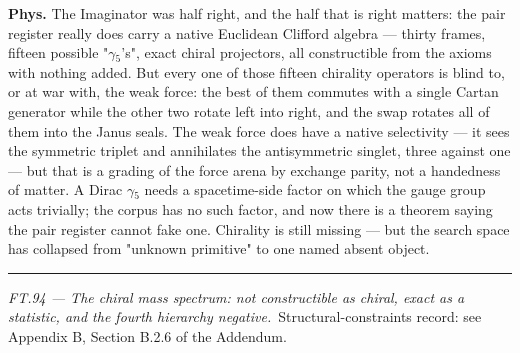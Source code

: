 \begin{theorem}
\textbf{Phys.} The Imaginator was half right, and the half that is right matters: the pair register really does carry a native Euclidean Clifford algebra — thirty frames, fifteen possible "$\gamma$$_5$'s", exact chiral projectors, all constructible from the axioms with nothing added. But every one of those fifteen chirality operators is blind to, or at war with, the weak force: the best of them commutes with a single Cartan generator while the other two rotate left into right, and the swap rotates all of them into the Janus seals. The weak force does have a native selectivity — it sees the symmetric triplet and annihilates the antisymmetric singlet, three against one — but that is a grading of the force arena by exchange parity, not a handedness of matter. A Dirac $\gamma$$_5$ needs a spacetime-side factor on which the gauge group acts trivially; the corpus has no such factor, and now there is a theorem saying the pair register cannot fake one. Chirality is still missing — but the search space has collapsed from "unknown primitive" to one named absent object.

\vspace{2pt}\noindent\rule{\textwidth}{0.4pt}\vspace{2pt}

\end{theorem}

\medskip\noindent\textit{\texorpdfstring{FT.94 — The chiral mass spectrum: not constructible as chiral, exact as a statistic, and the fourth hierarchy negative}{FT.94 - The chiral mass spectrum: not constructible as chiral, exact as a statistic, and the fourth hierarchy negative}.}\ Structural-constraints record: see Appendix B, Section B.2.6 of the Addendum.\par\medskip


